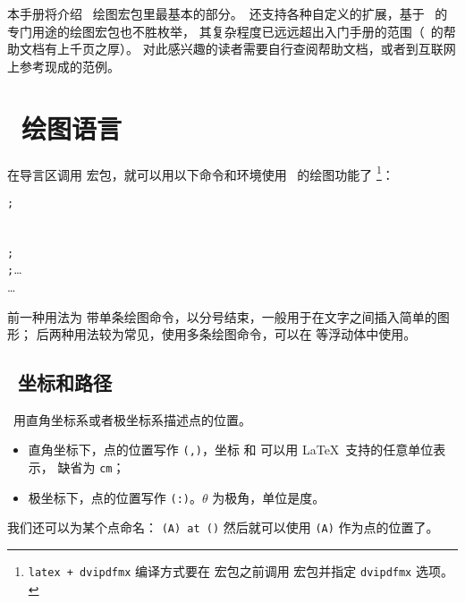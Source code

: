 本手册将介绍 \TikZ\ 绘图宏包里最基本的部分。\TikZ\ 还支持各种自定义的扩展，基于 \TikZ\ 的专门用途的绘图宏包也不胜枚举，
其复杂程度已远远超出入门手册的范围（\TikZ\ 的帮助文档有上千页之厚）。
对此感兴趣的读者需要自行查阅帮助文档，或者到互联网上参考现成的范例。

\section{\TikZ\ 绘图语言}\label{sec:tikz}

在导言区调用  宏包，就可以用以下命令和环境使用 \TikZ\ 的绘图功能了%
\footnote{\texttt{latex + dvipdfmx} 编译方式要在  宏包之前调用  宏包并指定 \texttt{dvipdfmx} 选项。}：
\begin{command}
\oarg*{\ldots} \texttt{;} \\[1ex]
\oarg*{\ldots}  \\[1ex]
\oarg*{\ldots} \\
\texttt{;} \\
\texttt{;}\ldots \\
\ldots \\
\end{command}

前一种用法为  带单条绘图命令，以分号结束，一般用于在文字之间插入简单的图形；
后两种用法较为常见，使用多条绘图命令，可以在  等浮动体中使用。

\subsection{\TikZ\ 坐标和路径}\label{subsec:tikz-path}

\TikZ\ 用直角坐标系或者极坐标系描述点的位置。
\begin{itemize}
  \item 直角坐标下，点的位置写作 \texttt{(,)}，坐标  和  可以用 \LaTeX\ 支持的任意单位表示，
  缺省为 \texttt{cm}；
  \item 极坐标下，点的位置写作 \texttt{(\Arg{$\theta$}:)}。$\theta$ 为极角，单位是度。
\end{itemize}

我们还可以为某个点命名： \texttt{(A) at ()} 
然后就可以使用 \texttt{(A)} 作为点的位置了。

